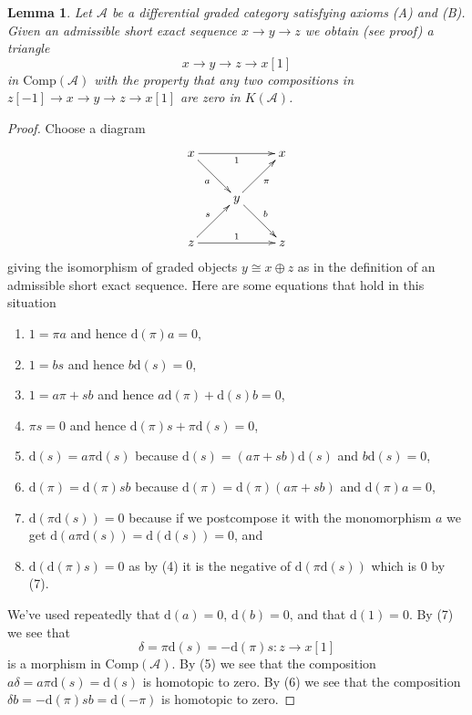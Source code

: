 \documentclass{stacks-project}
\theoremstyle{plain}
\newtheorem{lemma}[subsection]{Lemma}
\theoremstyle{definition}
\theoremstyle{remark}
\numberwithin{equation}{subsection}
\begin{document}
\begin{lemma}
\label{lemma-get-triangle}
Let $\mathcal{A}$ be a differential graded category satisfying
axioms (A) and (B). Given an admissible short exact sequence
$x \to y \to z$ we obtain (see proof) a triangle
$$
x \to y \to z \to x[1]
$$
in $\text{Comp}(\mathcal{A})$ with the property that any two compositions
in $z[-1] \to x \to y \to z \to x[1]$ are zero in $K(\mathcal{A})$.
\end{lemma}

\begin{proof}
Choose a diagram
$$
\xymatrix{
x \ar[rr]_1 \ar[rd]_a & & x \\
& y \ar[ru]_\pi \ar[rd]^b & \\
z \ar[rr]^1 \ar[ru]^s & & z
}
$$
giving the isomorphism of graded objects $y \cong x \oplus z$ as in the
definition of an admissible short exact sequence. Here are some equations
that hold in this situation
\begin{enumerate}
\item $1 = \pi a$ and hence $\text{d}(\pi) a = 0$,
\item $1 = b s$ and hence $b \text{d}(s) = 0$,
\item $1 = a \pi + s b$ and hence $a \text{d}(\pi) + \text{d}(s) b = 0$,
\item $\pi s = 0$ and hence $\text{d}(\pi)s + \pi \text{d}(s) = 0$,
\item $\text{d}(s) = a \pi \text{d}(s)$ because
$\text{d}(s) = (a \pi + s b)\text{d}(s)$ and $b\text{d}(s) = 0$,
\item $\text{d}(\pi) = \text{d}(\pi) s b$ because
$\text{d}(\pi) = \text{d}(\pi)(a \pi + s b)$ and $\text{d}(\pi)a = 0$,
\item $\text{d}(\pi \text{d}(s)) = 0$ because if we postcompose it
with the monomorphism $a$ we get
$\text{d}(a\pi \text{d}(s)) = \text{d}(\text{d}(s)) = 0$, and
\item $\text{d}(\text{d}(\pi)s) = 0$ as by (4) it is the negative
of $\text{d}(\pi\text{d}(s))$ which is $0$ by (7).
\end{enumerate}
We've used repeatedly that $\text{d}(a) = 0$, $\text{d}(b) = 0$,
and that $\text{d}(1) = 0$. By (7) we see that
$$
\delta = \pi \text{d}(s) = - \text{d}(\pi) s : z \to x[1]
$$
is a morphism in $\text{Comp}(\mathcal{A})$. By (5) we see that
the composition $a \delta = a \pi \text{d}(s) = \text{d}(s)$
is homotopic to zero. By (6) we see that the composition
$\delta b = - \text{d}(\pi)sb = \text{d}(-\pi)$ is homotopic to zero.
\end{proof}
\end{document}
